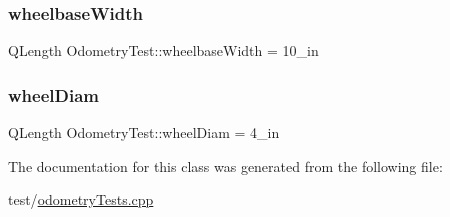 \subsubsection{\texorpdfstring{wheelbaseWidth}{wheelbaseWidth}}
{\footnotesize\ttfamily Q\+Length Odometry\+Test\+::wheelbase\+Width = 10\+\_\+in\hspace{0.3cm}{\ttfamily [protected]}}

\mbox{\label{classOdometryTest_a9f50ce54ff057f2dc7d573a7de22e3d2}} 
\subsubsection{\texorpdfstring{wheelDiam}{wheelDiam}}
{\footnotesize\ttfamily Q\+Length Odometry\+Test\+::wheel\+Diam = 4\+\_\+in\hspace{0.3cm}{\ttfamily [protected]}}



The documentation for this class was generated from the following file\+:\begin{DoxyCompactItemize}
\item 
test/\mbox{\hyperlink{odometryTests_8cpp}{odometry\+Tests.\+cpp}}\end{DoxyCompactItemize}

